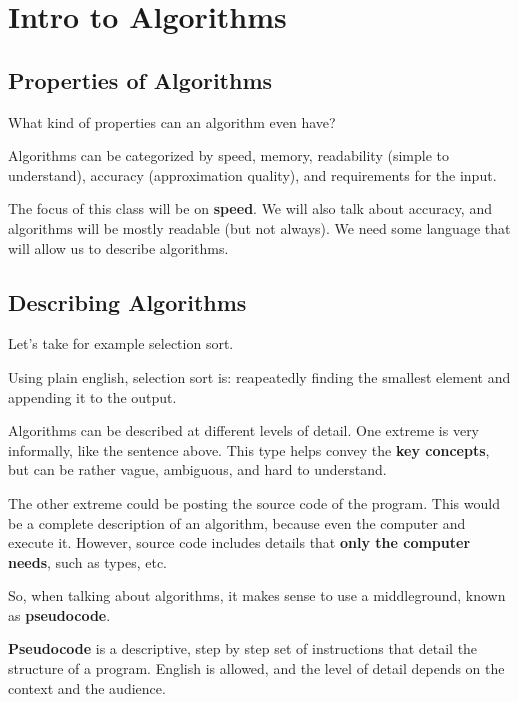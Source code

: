 
\section{Intro to Algorithms}
\subsection{Properties of Algorithms}

What kind of properties can an algorithm even have?

\begin{property}
	Algorithms can be categorized by speed, memory, readability (simple to understand), accuracy (approximation quality), and requirements for the input.
\end{property}

The focus of this class will be on \textbf{speed}. We will also talk about accuracy, and algorithms will be mostly readable (but not always). We need some language that will allow us to describe algorithms.

\subsection{Describing Algorithms}

\begin{eg}
	Let's take for example selection sort.
\end{eg}
\begin{explanation}
	Using plain english, selection sort is: reapeatedly finding the smallest element and appending it to the output.
\end{explanation}

Algorithms can be described at different levels of detail. One extreme is very informally, like the sentence above. This type helps convey the \textbf{key concepts}, but can be rather vague, ambiguous, and hard to understand.

The other extreme could be posting the source code of the program. This would be a complete description of an algorithm, because even the computer and execute it. However, source code includes details that \textbf{only the computer needs}, such as types, etc.

So, when talking about algorithms, it makes sense to use a middleground, known as \textbf{pseudocode}.

\begin{definition}
	\textbf{Pseudocode} is a descriptive, step by step set of instructions that detail the structure of a program. English is allowed, and the level of detail depends on the context and the audience.
\end{definition}

